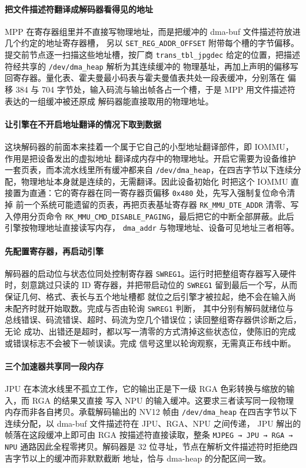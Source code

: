 \paragraph{把文件描述符翻译成解码器看得见的地址}
MPP 在寄存器组里并不直接写物理地址，而是把缓冲的 dma-buf 文件描述符放进几个约定的地址寄存器槽，
另以 \texttt{SET\_REG\_ADDR\_OFFSET} 附带每个槽的字节偏移。提交前节点逐一扫描这些地址槽，按厂商
\texttt{trans\_tbl\_jpgdec} 给定的位置，把描述符经共享的 \texttt{/dev/dma\_heap} 解析为其连续缓冲的
物理基址，再加上声明的偏移写回寄存器。量化表、霍夫曼最小码表与霍夫曼值表共处一段表缓冲，分别落在
偏移 384 与 704 字节处，输入码流与输出帧各占一个槽，于是 MPP 用文件描述符表达的一组缓冲被还原成
解码器能直接取用的物理地址。

\paragraph{让引擎在不开启地址翻译的情况下取到数据}
这块解码器的前面本来挂着一个属于它自己的小型地址翻译部件，即 IOMMU，作用是把设备发出的虚拟地址
翻译成内存中的物理地址。开启它需要为设备维护一套页表，而本流水线里所有缓冲都来自
\texttt{/dev/dma\_heap}，在四吉字节以下连续分配，物理地址本身就是连续的，无需翻译。因此设备初始化
时把这个 IOMMU 直接置为直通：它的寄存器在同一寄存器页偏移 \texttt{0x480} 处，先写入强制复位命令清掉
前一个系统可能遗留的页表，再把页表基址寄存器 \texttt{RK\_MMU\_DTE\_ADDR} 清零、写入停用分页命令
\texttt{RK\_MMU\_CMD\_DISABLE\_PAGING}，最后把它的中断全部屏蔽。此后引擎按物理地址直接读写内存，
\texttt{dma\_addr} 与物理地址、设备可见地址三者相等。

\paragraph{先配置寄存器，再启动引擎}
解码器的启动位与状态位同处控制寄存器 \texttt{SWREG1}。运行时把整组寄存器写入硬件时，刻意跳过只读的
ID 寄存器，并把带启动位的 \texttt{SWREG1} 留到最后一个写，从而保证几何、格式、表长与五个地址槽都
就位之后引擎才被拉起，绝不会在输入尚未配齐时就开始取数。完成与否由轮询 \texttt{SWREG1} 判断，
其中分别有解码就绪位与总线错误、码流错误、超时、码流为空几个错误位；读回整组寄存器供诊断之后，无论
成功、出错还是超时，都以写一清零的方式清掉这些状态位，使陈旧的完成或错误标志不会被下一帧误读。完成
信号这里以轮询观察，无需真正布线中断。

\paragraph{三个加速器共享同一段内存}
JPU 在本流水线里不孤立工作，它的输出正是下一级 RGA 色彩转换与缩放的输入，而 RGA 的结果又直接
写入 NPU 的输入缓冲。这要求三者读写同一段物理内存而非各自拷贝。承载解码输出的 NV12 帧由
\texttt{/dev/dma\_heap} 在四吉字节以下连续分配，以 dma-buf 文件描述符在 JPU、RGA、NPU 之间传递，
JPU 解出的帧落在这段缓冲上即可由 RGA 按描述符直接读取，整条 \texttt{MJPEG\,→\,JPU\,→\,RGA\,→\,NPU}
通路因此全程零拷贝。解码器是 32 位寻址，节点在解析文件描述符时拒绝四吉字节以上的缓冲而非默默截断
地址，恰与 dma-heap 的分配区间一致。

